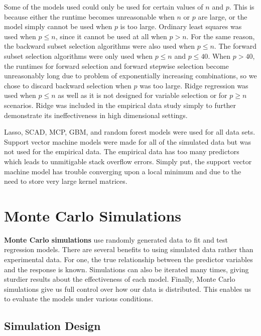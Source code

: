 \documentclass{article}
\begin{document}
Some of the models used could only be used for certain values of $n$ and $p$. This is because either the runtime becomes unreasonable when $n$ or $p$ are large, or the model simply cannot be used when $p$ is too large. Ordinary least squares was used when $p\leq n$, since it cannot be used at all when $p>n$. For the same reason, the backward subset selection algorithms were also used when $p\leq n$. The forward subset selection algorithms were only used when $p\leq n$ and $p\leq 40$. When $p>40$, the runtimes for forward selection and forward stepwise selection become unreasonably long due to problem of exponentially increasing combinations, so we chose to discard backward selection when $p$ was too large. Ridge regression was used when $p\leq n$ as well as it is not designed for variable selection or for $p \geq n$ scenarios. Ridge was included in the empirical data study simply to further demonstrate its ineffectiveness in high dimensional settings.

Lasso, SCAD, MCP, GBM, and random forest models were used for all data sets. Support vector machine models were made for all of the simulated data but was not used for the empirical data. The empirical data has too many predictors which leads to unmitigable stack overflow errors. Simply put, the support vector machine model has trouble converging upon a local minimum and due to the need to store very large kernel matrices.

\section{Monte Carlo Simulations}\label{sec:simulations}

\textbf{Monte Carlo simulations} use randomly generated data to fit and test regression  models. There are several benefits to using simulated data rather than experimental data. For one, the true relationship between the predictor variables and the response is known. Simulations can also be iterated many times, giving sturdier results about the effectiveness of each model. Finally, Monte Carlo simulations give us full control over how our data is distributed. This enables us to evaluate the models under various conditions.


\subsection{Simulation Design}
\end{document}

